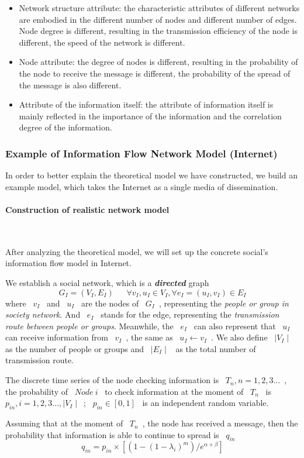\documentclass[a4paper,11pt]{article}
\begin{document}
\begin{itemize}
\item Network structure attribute: the characteristic attributes of different networks are embodied in the different number of nodes and different number of edges. Node degree is different, resulting in the transmission efficiency of the node is different, the speed of the network is different.
\item Node attribute: the degree of nodes is different, resulting in the probability of the node to receive the message is different, the probability of the spread of the message is also different.
\item Attribute of the information itself: the attribute of information itself is mainly reflected in the importance of the information and the correlation degree of the information.
\end{itemize}

\subsubsection{Example of Information Flow Network Model (Internet)}
\par In order to better explain the theoretical model we have constructed, we build an example model, which takes the Internet as a single media of dissemination.
\paragraph{Construction of realistic network model}
\textrm{\\}
\par After analyzing the theoretical model, we will set up the concrete social's information flow model in Internet.
\par We establish a social network, which is a \textbf{\emph{directed}} graph
\begin{equation}
G_I=(V_I,E_I)~~~~~~~\forall  v_I,u_I\in V_I , \forall e_I=(u_I,v_I)\in E_I
\end{equation}
where ~$v_I$~ and ~$u_I$~ are the nodes of ~$G_I$~, representing the \emph{people or group in society network}. And ~$e_I$~ stands for the edge, representing the \emph{transmission route between people or groups}. Meanwhile, the ~$e_I$~ can also represent that ~$u_I$~ can receive information from ~$v_I$~, the same as ~$u_I\leftarrow v_I$~. We also define ~$\mid V_I\mid$~ as the number of people or groups and ~$\mid E_I\mid$~ as the total number of transmission route.
\par The discrete time series of the node checking information is ~$T_n,n=1,2,3...$~, the probability of ~$Node~i$~ to check information at the moment of ~$T_n$~ is ~$p_{in},i=1,2,3...,\mid V_I\mid$~; ~$p_{in}\in [0,1]$~ is an independent random variable.
\par Assuming that at the moment of ~$T_n$~, the node has received a message, then the probability that information is able to continue to spread is ~$q_{in}$~
\begin{equation}
q_{in}=p_{in} \times [(1-(1-\lambda_{i})^m)/e^{\alpha +\beta}]
\end{equation}
\end{document}
